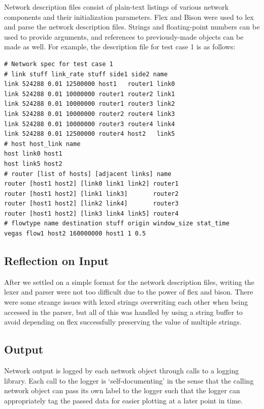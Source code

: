 \documentclass[12pt]{article}
\begin{document}
Network description files consist of plain-text listings of various network components and their initialization parameters. Flex and Bison were used to lex and parse the network description files. Strings and floating-point numbers can be used to provide arguments, and references to previously-made objects can be made as well. For example, the description file for test case 1 is as follows:
\begin{verbatim}
# Network spec for test case 1
# link stuff link_rate stuff side1 side2 name
link 524288 0.01 12500000 host1   router1 link0
link 524288 0.01 10000000 router1 router2 link1
link 524288 0.01 10000000 router1 router3 link2
link 524288 0.01 10000000 router2 router4 link3
link 524288 0.01 10000000 router3 router4 link4
link 524288 0.01 12500000 router4 host2   link5
# host host_link name
host link0 host1
host link5 host2
# router [list of hosts] [adjacent links] name
router [host1 host2] [link0 link1 link2] router1
router [host1 host2] [link1 link3]       router2
router [host1 host2] [link2 link4]       router3
router [host1 host2] [link3 link4 link5] router4
# flowtype name destination stuff origin window_size stat_time
vegas flow1 host2 160000000 host1 1 0.5
\end{verbatim}

\subsection*{Reflection on Input}

After we settled on a simple format for the network description files, writing the lexer and parser were not too difficult due to the power of flex and bison. There were some strange issues with lexed strings overwriting each other when being accessed in the parser, but all of this was handled by using a string buffer to avoid depending on flex successfully preserving the value of multiple strings.



\subsection{Output}

Network output is logged by each network object through calls to a logging library. Each call to the logger is ‘self-documenting’ in the sense that the calling network object can pass its own label to the logger such that the logger can appropriately tag the passed data for easier plotting at a later point in time.
\end{document}
